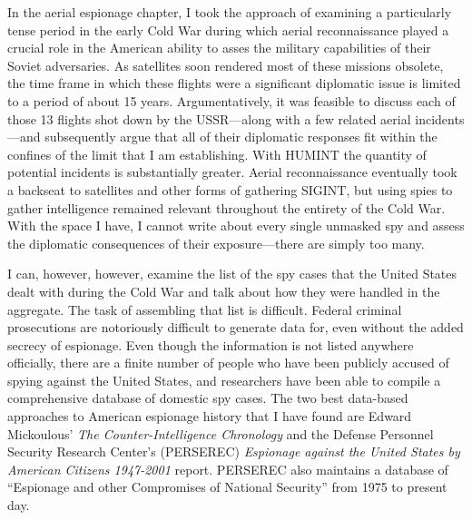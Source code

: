 \documentclass{memoir}
\begin{document}
\begin{refsegment}
In the aerial espionage chapter, I took the approach of examining a particularly tense period in the early Cold War during which aerial reconnaissance played a crucial role in the American ability to asses the military capabilities of their Soviet adversaries. As satellites soon rendered most of these missions obsolete, the time frame in which these flights were a significant diplomatic issue is limited to a period of about 15 years. Argumentatively, it was feasible to discuss each of those 13 flights shot down by the USSR---along with a few related aerial incidents---and subsequently argue that all of their diplomatic responses fit within the confines of the limit that I am establishing. With HUMINT the quantity of potential incidents is substantially greater. Aerial reconnaissance eventually took a backseat to satellites and other forms of gathering SIGINT, but using spies to gather intelligence remained relevant throughout the entirety of the Cold War. With the space I have, I cannot write about every single unmasked spy and assess the diplomatic consequences of their exposure---there are simply too many.

I can, however, however, examine the list of the spy cases that the United States dealt with during the Cold War and talk about how they were handled in the aggregate. The task of assembling that list is difficult. Federal criminal prosecutions are notoriously difficult to generate data for, even without the added secrecy of espionage. Even though the information is not listed anywhere officially, there are a finite number of people who have been publicly accused of spying against the United States, and researchers have been able to compile a comprehensive database of domestic spy cases. The two best data-based approaches to American espionage history that I have found are Edward Mickoulous' \emph{The Counter-Intelligence Chronology} and the Defense Personnel Security Research Center's (PERSEREC) \emph{Espionage against the United States by American Citizens 1947-2001} report. PERSEREC also maintains a database of ``Espionage and other Compromises of National Security'' from 1975 to present day.


\end{refsegment}
\end{document}
